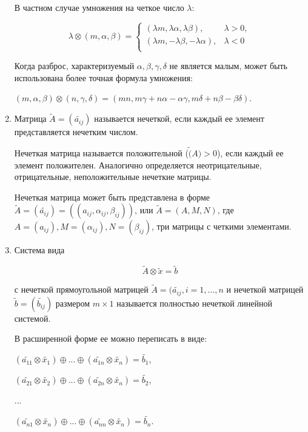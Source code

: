 \documentclass[12pt]{article}
\begin{document}
\begin{enumerate}
	      В частном случае умножения на четкое число $\lambda$:

	      $$
		      \lambda \otimes (m, \alpha, \beta) = \begin{cases}
			      (\lambda m, \lambda \alpha, \lambda \beta),     & \lambda > 0, \\
			      (\lambda m, - \lambda \beta, - \lambda \alpha), & \lambda < 0  \\
		      \end{cases}
	      $$

	      Когда разброс, характеризуемый $\alpha, \beta, \gamma, \delta$ не является
	      малым, может быть использована более точная формула умножения:

	      $ (m, \alpha, \beta) \otimes (n, \gamma, \delta) = (mn, m \gamma + n \alpha -
		      \alpha \gamma, m \delta + n \beta - \beta \delta )$.

	\item
	      Матрица $\tilde{A} = (\tilde{a_{ij}})$ называется нечеткой, если каждый ее
	      элемент представляется нечетким числом.

	      Нечеткая матрица называется положительной ($\tilde(A) > 0$), если каждый ее
	      элемент положителен. Аналогично определяется неотрицательные, отрицательные,
	      неположительные нечеткие матрицы.

	      Нечеткая матрица может быть представлена в форме $\tilde{A} =
		      (\tilde{a_{ij}}) = ((a_{ij}, \alpha_{ij}, \beta_{ij}))$, или
	      $\tilde{A} = (A, M, N)$, где $A = (a_{ij}), M = (\alpha_{ij}), N =
		      (\beta_{ij})$, три матрицы с четкими элементами.

	\item
	      Система вида

	      $$
		      \tilde{A} \otimes \tilde{x} = \tilde{b}
	      $$

	      с нечеткой прямоугольной матрицей $\tilde{A} = (\tilde{a_{ij}}, i = 1,...,n$
	      и нечеткой матрицей $\tilde{b} = (\tilde{b_{ij}})$ размером $m \times 1$
	      называется полностью нечеткой линейной системой.

	      В расширенной форме ее можно переписать в виде:

	      \begin{center}

		      $(\tilde{a_{11}} \otimes \tilde{x_1}) \oplus ... \oplus (\tilde{a_{1n}}
			      \otimes \tilde{x_n}) = \tilde{b_1}$,

		      $(\tilde{a_{21}} \otimes \tilde{x_2}) \oplus ... \oplus (\tilde{a_{2n}}
			      \otimes \tilde{x_n}) = \tilde{b_2}$,

		      ...

		      $(\tilde{a_{n1}} \otimes \tilde{x_n}) \oplus ... \oplus (\tilde{a_{nn}}
			      \otimes \tilde{x_n}) = \tilde{b_n}$.
	      \end{center}

\end{enumerate}
\end{document}
